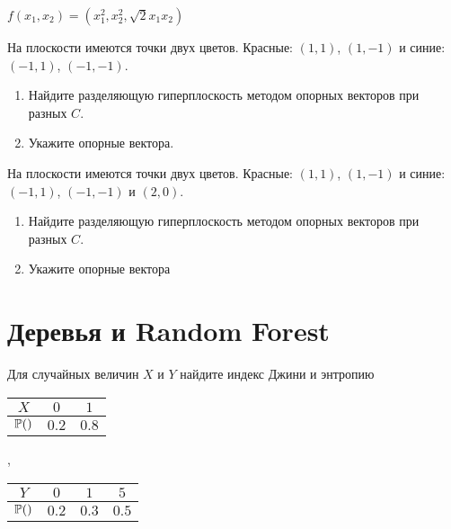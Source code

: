 \documentclass[pdftex,11pt,openany]{book}\usepackage[]{graphicx}\usepackage[]{color}
\begin{document}
\begin{solution}
$f(x_1,x_2)=(x_1^2,x_2^2,\sqrt{2}x_1x_2)$
\end{solution}


\begin{problem}
На плоскости имеются точки двух цветов. Красные: $(1,1)$, $(1,-1)$ и синие: $(-1,1)$, $(-1,-1)$. 
\begin{enumerate}
\item Найдите разделяющую гиперплоскость методом опорных векторов при разных $C$. 
\item Укажите опорные вектора.
\end{enumerate}
 
\end{problem}

\begin{solution}
\end{solution}

\begin{problem}
На плоскости имеются точки двух цветов. Красные: $(1,1)$, $(1,-1)$ и синие: $(-1,1)$, $(-1,-1)$ и $(2,0)$. 
\begin{enumerate}
\item Найдите разделяющую гиперплоскость методом опорных векторов при разных $C$.
\item Укажите опорные вектора
\end{enumerate}
 
\end{problem}

\begin{solution}
\end{solution}

\chapter{Деревья и Random Forest}


\begin{problem}
Для случайных величин  $X$ и $Y$ найдите индекс Джини и энтропию


\begin{tabular}{ccc}
$X$ & $0$ & $1$ \\ 
\hline 
$\P()$ & $0.2$ & $0.8$ \\ 
\end{tabular},
\begin{tabular}{cccc}
$Y$ & $0$ & $1$ & $5$ \\ 
\hline 
$\P()$ & $0.2$ & $0.3$ & $0.5$ \\ 
\end{tabular} 
\end{problem}
\end{document}
